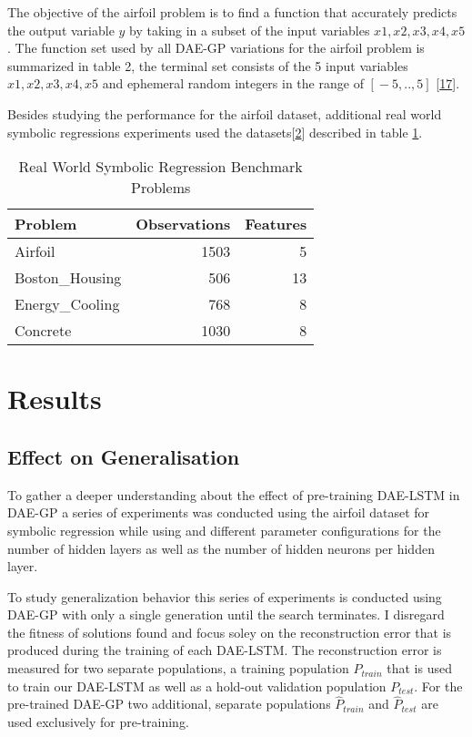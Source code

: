 \documentclass[
  11pt,
]{article}
\begin{document}
The objective of the airfoil problem is to find a function that accurately predicts the output variable \(y\) by taking in a subset of the input variables \(x1,x2,x3,x4,x5\). The function set used by all DAE-GP variations for the airfoil problem is summarized in table 2, the terminal set consists of the 5 input variables \(x1,x2,x3,x4,x5\) and ephemeral random integers in the range of \([{}-5,..,5]\) {[}\protect\hyperlink{ref-dae-gp_2022_symreg}{17}{]}.

Besides studying the performance for the airfoil dataset, additional real world symbolic regressions experiments used the datasets{[}\protect\hyperlink{ref-machine_learning_repo}{2}{]} described in table \ref{tab:full-run-realWorldSymReg-problems}.

\begin{table}[!h]

\caption{\label{tab:full-run-realWorldSymReg-problems}Real World Symbolic Regression Benchmark Problems}
\centering
\begin{tabular}[t]{l|r|r}
\hline
\textbf{Problem} & \textbf{Observations} & \textbf{Features}\\
\hline
Airfoil & 1503 & 5\\
\hline
Boston\_Housing & 506 & 13\\
\hline
Energy\_Cooling & 768 & 8\\
\hline
Concrete & 1030 & 8\\
\hline
\end{tabular}
\end{table}

\hypertarget{results}{%
\section{Results}\label{results}}

\hypertarget{effect-on-generalisation}{%
\subsection{Effect on Generalisation}\label{effect-on-generalisation}}

To gather a deeper understanding about the effect of pre-training DAE-LSTM in DAE-GP a series of experiments was conducted using the airfoil dataset for symbolic regression while using and different parameter configurations for the number of hidden layers as well as the number of hidden neurons per hidden layer.

To study generalization behavior this series of experiments is conducted using DAE-GP with only a single generation until the search terminates. I disregard the fitness of solutions found and focus soley on the reconstruction error that is produced during the training of each DAE-LSTM. The reconstruction error is measured for two separate populations, a training population \(P_{train}\) that is used to train our DAE-LSTM as well as a hold-out validation population \(P_{test}\). For the pre-trained DAE-GP two additional, separate populations \(\hat{P}_{train}\) and \(\hat{P}_{test}\) are used exclusively for pre-training.
\end{document}
